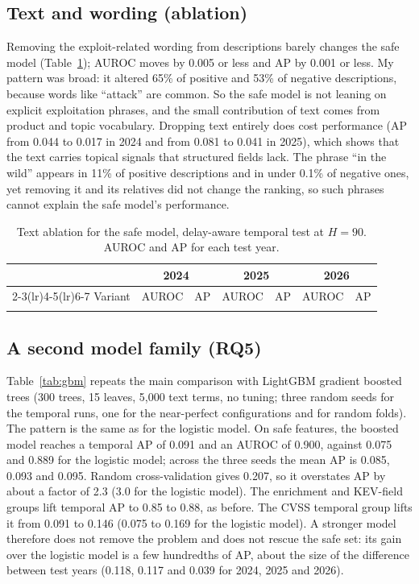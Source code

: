 \documentclass[conference,a4paper]{IEEEtran}
\begin{document}
\subsection{Text and wording (ablation)}

Removing the exploit-related wording from descriptions barely changes the safe model (Table~\ref{tab:abl}); AUROC moves by 0.005 or less and AP by 0.001 or less. My pattern was broad: it altered 65\% of positive and 53\% of negative descriptions, because words like ``attack'' are common. So the safe model is not leaning on explicit exploitation phrases, and the small contribution of text comes from product and topic vocabulary. Dropping text entirely does cost performance (AP from 0.044 to 0.017 in 2024 and from 0.081 to 0.041 in 2025), which shows that the text carries topical signals that structured fields lack. The phrase ``in the wild'' appears in 11\% of positive descriptions and in under 0.1\% of negative ones, yet removing it and its relatives did not change the ranking, so such phrases cannot explain the safe model's performance.

\begin{table}[t]
\centering
\caption{Text ablation for the safe model, delay-aware temporal test at $H=90$. AUROC and AP for each test year.}
\label{tab:abl}
\small
\begin{tabular}{lcccccc}
\toprule
 & \multicolumn{2}{c}{2024} & \multicolumn{2}{c}{2025} & \multicolumn{2}{c}{2026}\\
\cmidrule(lr){2-3}\cmidrule(lr){4-5}\cmidrule(lr){6-7}
Variant & AUROC & AP & AUROC & AP & AUROC & AP \\
\midrule
\\
\bottomrule
\end{tabular}
\end{table}

\subsection{A second model family (RQ5)}

Table~\ref{tab:gbm} repeats the main comparison with LightGBM gradient boosted trees (300 trees, 15 leaves, 5{,}000 text terms, no tuning; three random seeds for the temporal runs, one for the near-perfect configurations and for random folds). The pattern is the same as for the logistic model. On safe features, the boosted model reaches a temporal AP of 0.091 and an AUROC of 0.900, against 0.075 and 0.889 for the logistic model; across the three seeds the mean AP is 0.085, 0.093 and 0.095. Random cross-validation gives 0.207, so it overstates AP by about a factor of 2.3 (3.0 for the logistic model). The enrichment and KEV-field groups lift temporal AP to 0.85 to 0.88, as before. The CVSS temporal group lifts it from 0.091 to 0.146 (0.075 to 0.169 for the logistic model). A stronger model therefore does not remove the problem and does not rescue the safe set: its gain over the logistic model is a few hundredths of AP, about the size of the difference between test years (0.118, 0.117 and 0.039 for 2024, 2025 and 2026).
\end{document}
